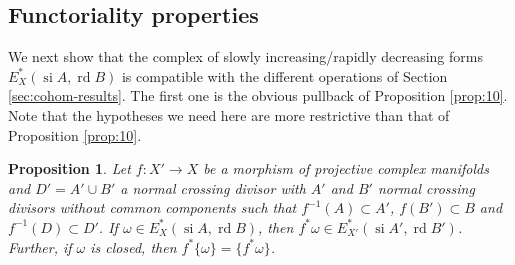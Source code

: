\documentclass[11pt,a4paper]{amsart}
\DeclareMathOperator{\si}{si}
\DeclareMathOperator{\rd}{rd}
\numberwithin{equation}{section}
\theoremstyle{plain}
\newtheorem{prop}{Proposition}[section]
\theoremstyle{definition}
\begin{document}
\subsection{Functoriality properties}
\label{sec:funct-prop}
We next show that the complex of slowly increasing/rapidly decreasing
forms $E_{X}^\ast(\si A,\rd B)$ is compatible
with the different operations of Section  \ref{sec:cohom-results}.
The first one is the obvious pullback of Proposition
\ref{prop:10}. Note that the hypotheses we need here are more restrictive than that
of  Proposition \ref{prop:10}.
\begin{prop}\label{prop:4-4'}
  Let $f\colon X'\to X$ be a morphism of projective complex manifolds
  and $D'=A'\cup B'$ a normal crossing divisor with $A'$ and $B'$
  normal crossing divisors without common components such that
  $f^{-1}(A)\subset A'$,  $f(B')\subset B$ and 
  $f^{-1}(D)\subset D'$. If $\omega\in E^{\ast}_{X}(\si A, \rd B)$,
  then $f^{\ast}\omega\in E^{\ast}_{X'}(\si A', \rd B')$. Further, if
  $\omega$ is closed, then $f^{\ast}\{\omega\}=\{f^{\ast}\omega\}$.
\end{prop}
\end{document}
